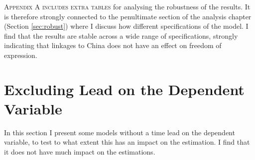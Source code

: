 \lettrine{A}{ppendix A includes extra tables} for analysing the robustness of the results. It is therefore strongly connected to the penultimate section of the analysis chapter (Section \ref{sec:robust}) where I discuss how different specifications of the model. I find that the results are stable across a wide range of specifications, strongly indicating that linkages to China does not have an effect on freedom of expression.

\section{Excluding Lead on the Dependent Variable}
In this section I present some models without a time lead on the dependent variable, to test to what extent this has an impact on the estimation. I find that it does not have much impact on the estimations.


